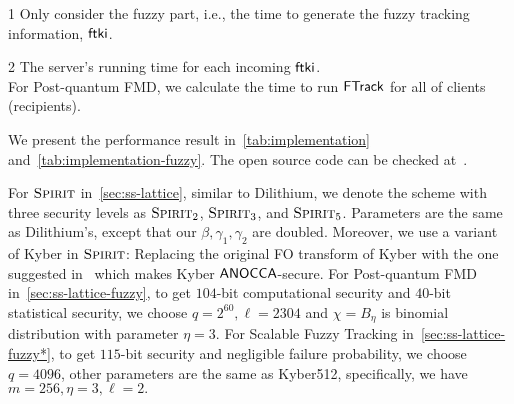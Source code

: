\begin{table*}[!t]
\renewcommand{\arraystretch}{1.2}
\caption{Performance Result of Constructions in~\cref{sec:ss-lattice-fuzzy} and~\cref{sec:ss-lattice-fuzzy*}}
\label{tab:implementation-fuzzy}

\centering
\begin{threeparttable}  
 \begin{tablenotes}
 \scriptsize 
  \item[1] \label{tn:impl-fuzzy:1} Only consider the fuzzy part, i.e., the time to generate the fuzzy tracking information, $\mathsf{ftki}$.
    \item[2] \label{tn:impl-fuzzy:2} The server's running time for each incoming $\mathsf{ftki}$. \\
    For Post-quantum FMD, we calculate the time to run $\mathsf{FTrack}$ for all of clients (recipients).
\end{tablenotes}
\end{threeparttable}  
\end{table*}

We present the performance result in~\cref{tab:implementation} and~\cref{tab:implementation-fuzzy}. The open source code can be checked at~\cite{implementation}.

For $\textsc{Spirit}$ in~\cref{sec:ss-lattice}, similar to Dilithium, we denote the scheme with three security levels as $\textsc{Spirit}_2$, $\textsc{Spirit}_3$, and $\textsc{Spirit}_5$. Parameters are the same as Dilithium's, except that our $\beta,\gamma_1,\gamma_2$ are doubled. Moreover, we use a variant of Kyber in $\textsc{Spirit}$: Replacing the original FO transform of Kyber with the one suggested in~\cite{EC:GruMarPat22} which makes Kyber $\mathsf{ANOCCA}$-secure.
For Post-quantum FMD in~\cref{sec:ss-lattice-fuzzy}, to get $104$-bit computational security and $40$-bit statistical security, we choose $q=2^{60}, \ell=2304$ and $\chi=B_\eta$ is binomial distribution with parameter $\eta=3$. 
For Scalable Fuzzy Tracking in~\cref{sec:ss-lattice-fuzzy*}, to get $115$-bit security and negligible failure probability, we choose $q=4096$, other parameters are the same as Kyber512, specifically, we have $m=256, \eta=3, \ell=2.$

